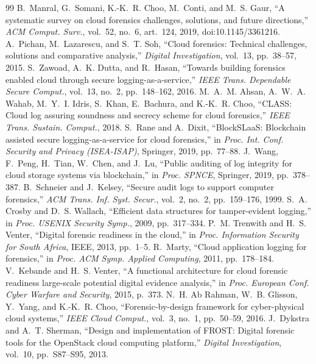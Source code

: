 \documentclass[conference,10pt]{IEEEtran}
\begin{document}
\begin{thebibliography}{99}
 B.~Manral, G.~Somani, K.-K.~R. Choo, M.~Conti, and M.~S. Gaur, ``A systematic survey on cloud forensics challenges, solutions, and future directions,'' \emph{ACM Comput. Surv.}, vol.~52, no.~6, art.~124, 2019, doi:10.1145/3361216.
 A.~Pichan, M.~Lazarescu, and S.~T. Soh, ``Cloud forensics: Technical challenges, solutions and comparative analysis,'' \emph{Digital Investigation}, vol.~13, pp.~38--57, 2015.
 S.~Zawoad, A.~K. Dutta, and R.~Hasan, ``Towards building forensics enabled cloud through secure logging-as-a-service,'' \emph{IEEE Trans. Dependable Secure Comput.}, vol.~13, no.~2, pp.~148--162, 2016.
 M.~A.~M. Ahsan, A.~W.~A. Wahab, M.~Y.~I. Idris, S.~Khan, E.~Bachura, and K.-K.~R. Choo, ``CLASS: Cloud log assuring soundness and secrecy scheme for cloud forensics,'' \emph{IEEE Trans. Sustain. Comput.}, 2018.
 S.~Rane and A.~Dixit, ``BlockSLaaS: Blockchain assisted secure logging-as-a-service for cloud forensics,'' in \emph{Proc. Int. Conf. Security and Privacy (ISEA-ISAP)}, Springer, 2019, pp.~77--88.
 J.~Wang, F.~Peng, H.~Tian, W.~Chen, and J.~Lu, ``Public auditing of log integrity for cloud storage systems via blockchain,'' in \emph{Proc. SPNCE}, Springer, 2019, pp.~378--387.
 B.~Schneier and J.~Kelsey, ``Secure audit logs to support computer forensics,'' \emph{ACM Trans. Inf. Syst. Secur.}, vol.~2, no.~2, pp.~159--176, 1999.
 S.~A. Crosby and D.~S. Wallach, ``Efficient data structures for tamper-evident logging,'' in \emph{Proc. USENIX Security Symp.}, 2009, pp.~317--334.
 P.~M. Trenwith and H.~S. Venter, ``Digital forensic readiness in the cloud,'' in \emph{Proc. Information Security for South Africa}, IEEE, 2013, pp.~1--5.
 R.~Marty, ``Cloud application logging for forensics,'' in \emph{Proc. ACM Symp. Applied Computing}, 2011, pp.~178--184.
 V.~Kebande and H.~S. Venter, ``A functional architecture for cloud forensic readiness large-scale potential digital evidence analysis,'' in \emph{Proc. European Conf. Cyber Warfare and Security}, 2015, p.~373.
 N.~H. Ab Rahman, W.~B. Glisson, Y.~Yang, and K.-K.~R. Choo, ``Forensic-by-design framework for cyber-physical cloud systems,'' \emph{IEEE Cloud Comput.}, vol.~3, no.~1, pp.~50--59, 2016.
 J.~Dykstra and A.~T. Sherman, ``Design and implementation of FROST: Digital forensic tools for the OpenStack cloud computing platform,'' \emph{Digital Investigation}, vol.~10, pp.~S87--S95, 2013.

\end{thebibliography}
\end{document}
